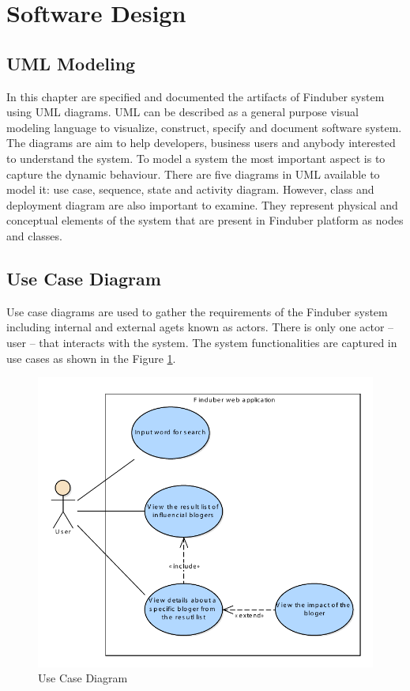 \section{Software Design}
\subsection{UML Modeling}

In this chapter are specified and documented the artifacts of Finduber system using UML diagrams. UML can be described as a general purpose visual modeling language to visualize, construct, specify and document software system. The diagrams are aim to help developers, business users and anybody interested to understand the system. To model a system the most important aspect is to capture the dynamic behaviour. There are five diagrams in UML available to model it: use case, sequence, state and activity diagram. However, class and deployment diagram are also important to examine. They represent physical and conceptual elements of the system that are present in Finduber platform as nodes and classes.

\subsection{Use Case Diagram}

Use case diagrams are used to gather the requirements of the Finduber system including internal and external agets known as actors. There is only one actor -- user -- that interacts with the system. The system functionalities are captured in use cases as shown in the Figure \ref{usecase_uml}.

\begin{figure}[!ht]
\centering
\includegraphics[width=15cm]{UseCase.pdf}
\caption{Use Case Diagram}\label{usecase_uml}
\end{figure}

